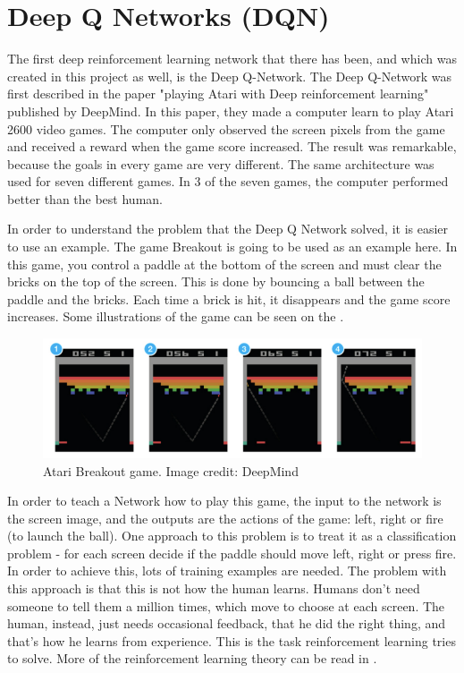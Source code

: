 \section{Deep Q Networks (DQN)}
\label{sec:DQN}
The first deep reinforcement learning network that there has been, and which was created in this project as well, is the Deep Q-Network. The Deep Q-Network was first described in the paper "playing Atari with Deep reinforcement learning" \cite{DBLP:journals/corr/MnihKSGAWR13} published by DeepMind. In this paper, they made a computer learn to play Atari 2600 video games. The computer only observed the screen pixels from the game and received a reward when the game score increased. The result was remarkable, because the goals in every game are very different. The same architecture was used for seven different games. In 3 of the seven games, the computer performed better than the best human.

In order to understand the problem that the Deep Q Network solved, it is easier to use an example. The game Breakout is going to be used as an example here. In this game, you control a paddle at the bottom of the screen and must clear the bricks on the top of the screen. This is done by bouncing a ball between the paddle and the bricks. Each time a brick is hit, it disappears and the game score increases. Some illustrations of the game can be seen on the .

\begin{figure}[H]
	\centering
	\includegraphics[width=1\textwidth]{Figures/Architecture/DQN/Atari_breakout.png}
	\caption{Atari Breakout game. Image credit: DeepMind\cite{DBLP:journals/corr/MnihKSGAWR13} }
	\label{fig:Atari_breakout}
\end{figure}

In order to teach a Network how to play this game, the input to the network is the screen image, and the outputs are the actions of the game: left, right or fire (to launch the ball). One approach to this problem is to treat it as a classification problem - for each screen decide if the paddle should move left, right or press fire. In order to achieve this, lots of training examples are needed. The problem with this approach is that this is not how the human learns. Humans don't need someone to tell them a million times, which move to choose at each screen. The human, instead, just needs occasional feedback, that he did the right thing, and that's how he learns from experience. This is the task reinforcement learning tries to solve. More of the reinforcement learning theory can be read in . 

